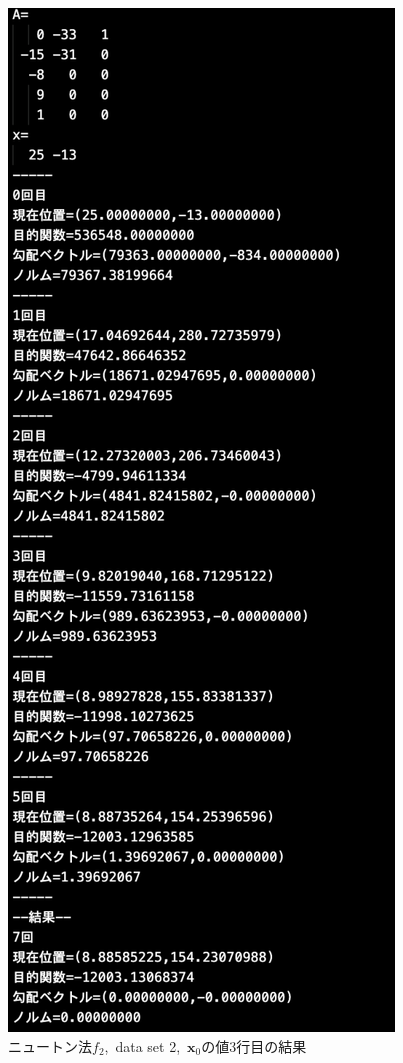 \documentclass[12pt]{jarticle}
\begin{document}
\clearpage
\begin{figure}[h]
    \begin{center}
        \includegraphics[scale=0.3]{kadai1_2n_out2_3_1.png}
    \end{center}
    \caption{ニュートン法$f_2$,\ data set 2,\ $\boldsymbol{x}_0$の値3行目の結果}
\end{figure}
\end{document}
